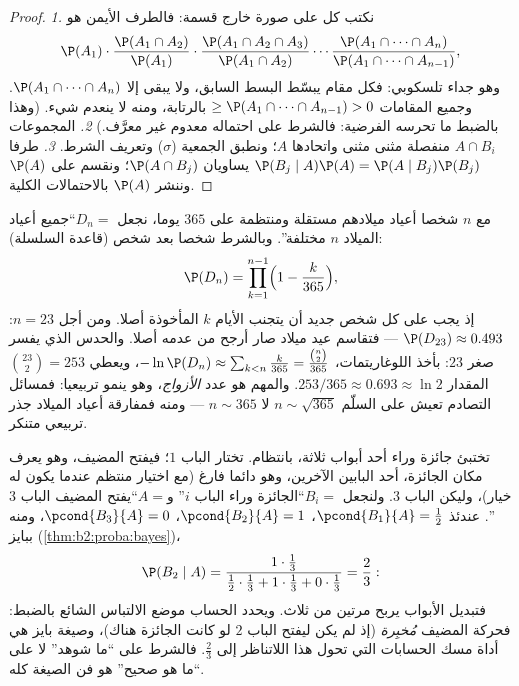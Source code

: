 \begin{proof}
\emph{1.} نكتب كل  على صورة خارج قسمة: فالطرف الأيمن هو
\[
\P(A_1)\cdot\frac{\P(A_1 \cap A_2)}{\P(A_1)}\cdot
\frac{\P(A_1 \cap A_2 \cap A_3)}{\P(A_1 \cap A_2)}\cdots
\frac{\P(A_1 \cap \dots \cap A_n)}{\P(A_1 \cap \dots \cap
A_{n-1})},
\]
وهو جداء تلسكوبي: فكل مقام يبسّط البسط السابق، ولا يبقى إلا $\P(A_1 \cap \dots \cap A_n)$.
وجميع المقامات $\geq \P(A_1 \cap \dots \cap A_{n-1}) >
0$ بالرتابة، ومنه لا ينعدم شيء. (وهذا بالضبط ما
تحرسه الفرضية: فالشرط على  احتماله معدوم غير معرَّف.)
\emph{2.} المجموعات $A \cap B_i$ منفصلة مثنى مثنى واتحادها $A$؛ ونطبق
الجمعية ($\sigma$) وتعريف الشرط.
\emph{3.} طرفا $\P(B_j \mid A)\P(A) = \P(A \mid
B_j)\P(B_j)$ يساويان $\P(A \cap B_j)$؛ ونقسم على $\P(A)$ وننشر
$\P(A)$ بالاحتمالات الكلية.
\end{proof}

\begin{example}\label{ex:b2:proba:birthday}
مع $n$ شخصا أعياد ميلادهم مستقلة ومنتظمة على $365$ يوما، نجعل
$D_n = {}$``جميع أعياد الميلاد $n$ مختلفة''. وبالشرط شخصا بعد شخص
(قاعدة السلسلة):
\[
\P(D_n) = \prod_{k=1}^{n-1}\Bigl(1 - \frac{k}{365}\Bigr),
\]
إذ يجب على كل شخص جديد أن يتجنب الأيام $k$ المأخوذة أصلا. ومن
أجل $n = 23$: $\P(D_{23}) \approx 0.493$ --- فتقاسم عيد ميلاد صار أرجح من عدمه أصلا.
والحدس الذي يفسر صغر $23$: بأخذ اللوغاريتمات، $-\ln
\P(D_n) \approx \sum_{k<n}\frac k{365} =
\frac{\binom n2}{365}$، ويعطي
$\binom{23}2 = 253$ المقدار $253/365 \approx 0.693 \approx \ln 2$. والمهم هو عدد \emph{الأزواج}، وهو ينمو
تربيعيا: فمسائل التصادم تعيش على السلّم $n \sim \sqrt{365}$ لا $n \sim
365$ --- ومنه
فمفارقة أعياد الميلاد جذر تربيعي متنكر.
\end{example}

\begin{example}\label{ex:b2:proba:montyhall}
تختبئ جائزة وراء أحد أبواب ثلاثة، بانتظام. تختار الباب $1$؛
فيفتح المضيف، وهو يعرف مكان الجائزة، أحد البابين الآخرين، وهو دائما
فارغ (مع اختيار منتظم عندما يكون له خيار)، وليكن الباب $3$.
ولنجعل $B_i = {}$``الجائزة وراء الباب $i$'' و$A = {}$``يفتح المضيف
الباب $3$''. عندئذ $\pcond{B_1}{A} = \frac12$، $\pcond{B_2}{A} = 1$، $\pcond{B_3}{A} = 0$، ومنه ببايز (\cref{thm:b2:proba:bayes})،
\[
\P(B_2 \mid A)
= \frac{1\cdot\frac13}
{\frac12\cdot\frac13 + 1\cdot\frac13 + 0\cdot\frac13}
= \frac23 :
\]
فتبديل الأبواب يربح مرتين من ثلاث. ويحدد الحساب موضع الالتباس الشائع
بالضبط: فحركة المضيف \emph{مُخبِرة} (إذ لم يكن ليفتح الباب $2$
لو كانت الجائزة هناك)، وصيغة بايز هي أداة مسك الحسابات التي تحول هذا
اللاتناظر إلى $\frac23$. فالشرط على ``ما شوهد'' لا على ``ما هو صحيح''
هو فن الصيغة كله.
\end{example}

